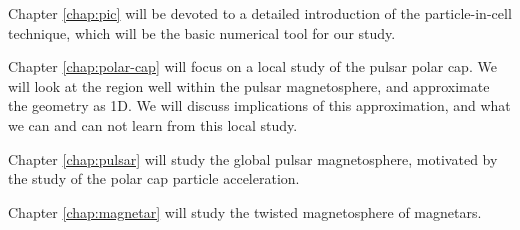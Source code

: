 Chapter \ref{chap:pic} will be devoted to a detailed introduction of the
particle-in-cell technique, which will be the basic numerical tool for our
study.

Chapter \ref{chap:polar-cap} will focus on a local study of the pulsar
polar cap. We will look at the region well within the pulsar magnetosphere, and
approximate the geometry as 1D. We will discuss implications of this
approximation, and what we can and can not learn from this local study.

Chapter \ref{chap:pulsar} will study the global pulsar magnetosphere, motivated
by the study of the polar cap particle acceleration.

Chapter \ref{chap:magnetar} will study the twisted magnetosphere of magnetars.

